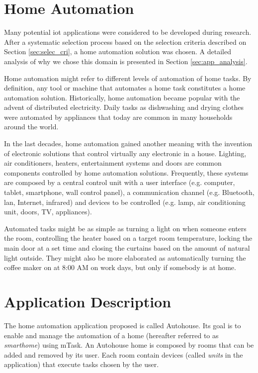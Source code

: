 \section{Home Automation}

Many potential \ac{iot} applications were considered to be developed during research. After a systematic selection process based on the selection criteria described on Section \ref{sec:selec_cri}, a home automation solution was chosen. A detailed analysis of why we chose this domain is presented in Section \ref{sec:app_analysis}.

Home automation might refer to different levels of automation of home tasks. By definition, any tool or machine that automates a home task constitutes a home automation solution. Historically, home automation became popular with the advent of distributed electricity. Daily tasks as dishwashing and drying clothes were automated by appliances that today are common in many households around the world.

In the last decades, home automation gained another meaning with the invention of electronic solutions that control virtually any electronic in a house. Lighting, air conditioners, heaters, entertainment systems and doors are common components controlled by home automation solutions. Frequently, these systems are composed by a central control unit with a user interface (e.g. computer, tablet, smartphone, wall control panel), a communication channel (e.g. Bluetooth, \acs{lan}, Internet, infrared) and devices to be controlled (e.g. lamp, air conditioning unit, doors, TV, appliances).

Automated tasks might be as simple as turning a light on when someone enters the room, controlling the heater based on a target room temperature, locking the main door at a set time and closing the curtains based on the amount of natural light outside. They might also be more elaborated as automatically turning the coffee maker on at 8:00 AM on work days, but only if somebody is at home.

\section{Application Description}\label{sec:app_desc}

The home automation application proposed is called Autohouse. Its goal is to enable and manage the automation of a home (hereafter referred to as \textit{smarthome}) using mTask. An Autohouse home is composed by rooms that can be added and removed by its user. Each room contain devices (called \textit{units} in the application) that execute tasks chosen by the user. 

